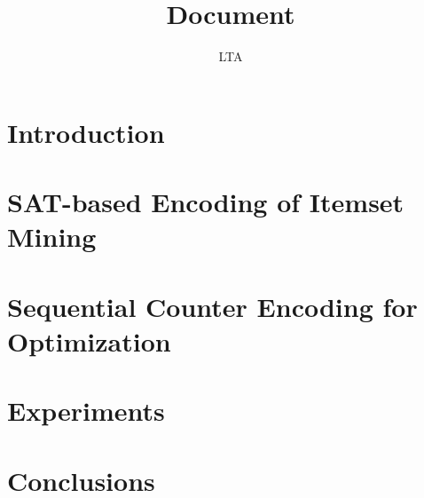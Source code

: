 \documentclass[13pt,a4paper]{report}
\title{Document}
\author{LTA}
\begin{document}










\fontsize{13}{15}\selectfont

\chapter{Introduction}




\chapter{SAT-based Encoding of Itemset Mining}






\chapter{Sequential Counter Encoding for Optimization}






\chapter{Experiments}



\chapter{Conclusions}



\nocite{*}
\renewcommand{\bibname}{References}
\printbibliography
{}
\end{document}
